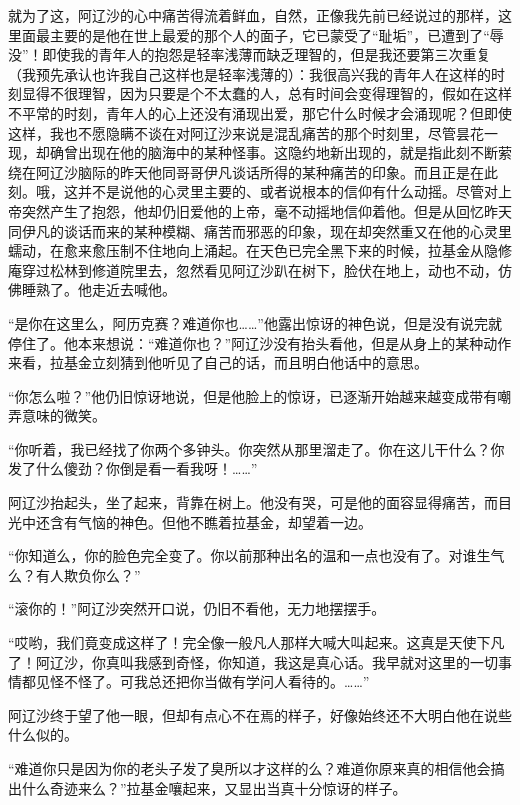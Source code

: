\par 就为了这，阿辽沙的心中痛苦得流着鲜血，自然，正像我先前已经说过的那样，这里面最主要的是他在世上最爱的那个人的面子，它已蒙受了“耻垢”，已遭到了“辱没”！即使我的青年人的抱怨是轻率浅薄而缺乏理智的，但是我还要第三次重复（我预先承认也许我自己这样也是轻率浅薄的）：我很高兴我的青年人在这样的时刻显得不很理智，因为只要是个不太蠢的人，总有时间会变得理智的，假如在这样不平常的时刻，青年人的心上还没有涌现出爱，那它什么时候才会涌现呢？但即使这样，我也不愿隐瞒不谈在对阿辽沙来说是混乱痛苦的那个时刻里，尽管昙花一现，却确曾出现在他的脑海中的某种怪事。这隐约地新出现的，就是指此刻不断萦绕在阿辽沙脑际的昨天他同哥哥伊凡谈话所得的某种痛苦的印象。而且正是在此刻。哦，这并不是说他的心灵里主要的、或者说根本的信仰有什么动摇。尽管对上帝突然产生了抱怨，他却仍旧爱他的上帝，毫不动摇地信仰着他。但是从回忆昨天同伊凡的谈话而来的某种模糊、痛苦而邪恶的印象，现在却突然重又在他的心灵里蠕动，在愈来愈压制不住地向上涌起。在天色已完全黑下来的时候，拉基金从隐修庵穿过松林到修道院里去，忽然看见阿辽沙趴在树下，脸伏在地上，动也不动，仿佛睡熟了。他走近去喊他。
\par “是你在这里么，阿历克赛？难道你也……”他露出惊讶的神色说，但是没有说完就停住了。他本来想说：“难道你也？”阿辽沙没有抬头看他，但是从身上的某种动作来看，拉基金立刻猜到他听见了自己的话，而且明白他话中的意思。
\par “你怎么啦？”他仍旧惊讶地说，但是他脸上的惊讶，已逐渐开始越来越变成带有嘲弄意味的微笑。
\par “你听着，我已经找了你两个多钟头。你突然从那里溜走了。你在这儿干什么？你发了什么傻劲？你倒是看一看我呀！……”
\par 阿辽沙抬起头，坐了起来，背靠在树上。他没有哭，可是他的面容显得痛苦，而目光中还含有气恼的神色。但他不瞧着拉基金，却望着一边。
\par “你知道么，你的脸色完全变了。你以前那种出名的温和一点也没有了。对谁生气么？有人欺负你么？”
\par “滚你的！”阿辽沙突然开口说，仍旧不看他，无力地摆摆手。
\par “哎哟，我们竟变成这样了！完全像一般凡人那样大喊大叫起来。这真是天使下凡了！阿辽沙，你真叫我感到奇怪，你知道，我这是真心话。我早就对这里的一切事情都见怪不怪了。可我总还把你当做有学问人看待的。……”
\par 阿辽沙终于望了他一眼，但却有点心不在焉的样子，好像始终还不大明白他在说些什么似的。
\par “难道你只是因为你的老头子发了臭所以才这样的么？难道你原来真的相信他会搞出什么奇迹来么？”拉基金嚷起来，又显出当真十分惊讶的样子。
